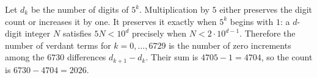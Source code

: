 Let $d_k$ be the number of digits of $5^k$. Multiplication by $5$ either preserves the digit count or increases it by one. It preserves it exactly when $5^k$ begins with $1$: a $d$-digit integer $N$ satisfies $5N<10^d$ precisely when $N<2\cdot10^{d-1}$. Therefore the number of verdant terms for $k=0,\ldots,6729$ is the number of zero increments among the $6730$ differences $d_{k+1}-d_k$. Their sum is $4705-1=4704$, so the count is $6730-4704=\boxed{2026}$.
